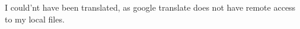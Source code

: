 I could'nt have been translated, as google translate does not have remote access to my local files. 